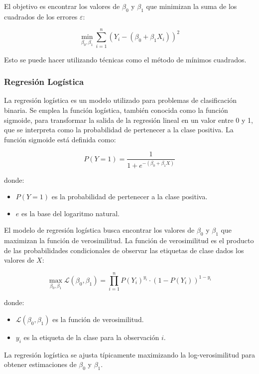 \documentclass{book}
\begin{document}
El objetivo es encontrar los valores de \(\beta_0\) y \(\beta_1\) que minimizan la suma de los cuadrados de los errores \(\varepsilon\):

\[
\min_{\beta_0, \beta_1} \sum_{i=1}^{n} (Y_i - (\beta_0 + \beta_1 X_i))^2
\]

Esto se puede hacer utilizando técnicas como el método de mínimos cuadrados.

\subsubsection{Regresión Logística}

La regresión logística es un modelo utilizado para problemas de clasificación binaria. Se emplea la función logística, también conocida como la función sigmoide, para transformar la salida de la regresión lineal en un valor entre 0 y 1, que se interpreta como la probabilidad de pertenecer a la clase positiva. La función sigmoide está definida como:

\[
P(Y=1) = \frac{1}{1 + e^{-(\beta_0 + \beta_1 X)}}
\]

donde:
\begin{itemize}
    \item \(P(Y=1)\) es la probabilidad de pertenecer a la clase positiva.
    \item \(e\) es la base del logaritmo natural.
\end{itemize}

El modelo de regresión logística busca encontrar los valores de \(\beta_0\) y \(\beta_1\) que maximizan la función de verosimilitud. La función de verosimilitud es el producto de las probabilidades condicionales de observar las etiquetas de clase dados los valores de \(X\):

\[
\max_{\beta_0, \beta_1} \mathcal{L}(\beta_0, \beta_1) = \prod_{i=1}^{n} P(Y_i)^{y_i} \cdot (1 - P(Y_i))^{1 - y_i}
\]

donde:
\begin{itemize}
    \item \(\mathcal{L}(\beta_0, \beta_1)\) es la función de verosimilitud.
    \item \(y_i\) es la etiqueta de la clase para la observación \(i\).
\end{itemize}

La regresión logística se ajusta típicamente maximizando la log-verosimilitud para obtener estimaciones de \(\beta_0\) y \(\beta_1\).
\end{document}
